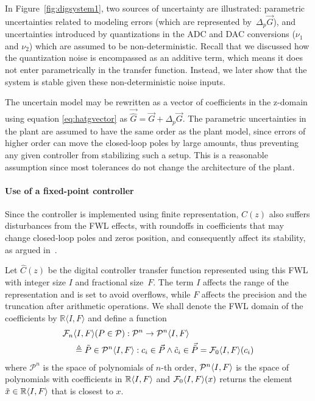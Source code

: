 \documentclass[final]{sig-alternate-05-2015}
\begin{document}
In Figure~\ref{fig:digsystem1}, two sources of uncertainty are illustrated:
parametric uncertainties related to modeling errors  
(which are represented by~$\Delta_p \vec{G}$),  
and uncertainties introduced by quantizations in the ADC and
DAC conversions ($\nu_1$ and $\nu_2$) which are assumed to be non-deterministic. 
Recall that we discussed how the quantization noise is encompassed as an additive term, 
which means it does not enter parametrically in the transfer function. 
Instead, we later show that the system is stable given these non-deterministic noise inputs. 

The uncertain model may be rewritten as a vector of coefficients in the 
z-domain using equation \eqref{eq:hatgvector} as  
$\vec{\hat{G}}=\vec{G}+\Delta_p \vec{G}$.
The parametric uncertainties in the plant are assumed to have the same
order as the plant model, since 
errors of higher order can move the closed-loop poles by large amounts, 
thus preventing any given controller from stabilizing such a setup. 
This is a reasonable assumption since most tolerances do not change the 
architecture of the plant. 



\smallskip

\paragraph{Use of a fixed-point controller}

Since the controller is implemented using finite representation, $C(z)$ also suffers
disturbances from the FWL effects, with roundoffs in coefficients that may
change closed-loop poles and zeros position, and consequently affect its
stability, as argued in~\cite{Bessa16}.

Let $\hat{C}(z)$ be the digital controller transfer function represented
using this FWL with integer size $I$ and fractional size~$F$. 
The term $I$ affects the range of the representation and is set to avoid overflows, 
while $F$ affects the precision and the truncation after arithmetic operations. 
We shall denote the FWL domain of the coefficients by $\mathbb{R}\langle I,F
\rangle$ and define a function
\begin{align}
\small
\mathcal{F}_n&\param{I}{F}(P \in \mathcal{P}):\mathcal{P}^{n}\rightarrow \mathcal{P}^{n}\param{I}{F} \\
&\triangleq \tilde P \in \mathcal{P}^{n}\param{I}{F} : c_i \in \vec{P} \wedge \tilde c_i \in \vec{\tilde{P}}=\mathcal{F}_0\param{I}{F}(c_i)  \nonumber
\end{align}
where $\mathcal{P}^{n}$ is the space of polynomials of $n$-th order,
$\mathcal{P}^{n}\langle{I},{F}\rangle$ is the space of polynomials with coefficients in
$\mathbb{R}\langle{I},{F}\rangle$ and $\mathcal{F}_0\langle{I},{F}\rangle(x)$ returns the
element $\tilde{x} \in \mathbb{R}\langle{I},{F}\rangle$ that is closest to $x$.
\end{document}
